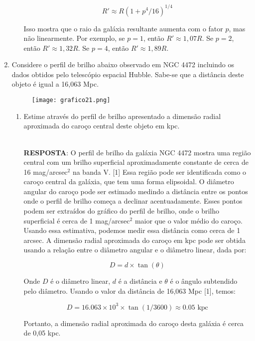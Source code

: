 \documentclass[a4paper,12pt]{article}
\begin{document}
\begin{enumerate}
\begin{enumerate}
$$
R' \approx R(1+p^4/16)^{1/4}
$$

Isso mostra que o raio da galáxia resultante aumenta com o fator $p$, mas não linearmente. Por exemplo, se $p=1$, então $R' \approx 1,07 R$. Se $p=2$, então $R' \approx 1,32 R$. Se $p=4$, então $R' \approx 1,89 R$.

\noindent\hrulefill

\end{enumerate}

\item Considere o perfil de brilho abaixo observado em NGC 4472 incluindo os dados obtidos pelo telescópio espacial Hubble. Sabe-se que a distância deste objeto é igual a 16,063 Mpc.

\begin{figure}[H]
\centering
\texttt{[image: grafico21.png]}
\end{figure}

\begin{enumerate}
\item Estime através do perfil de brilho apresentado a dimensão radial aproximada do caroço central deste objeto em kpc.

\noindent\hrulefill\\\textbf{RESPOSTA}: O perfil de brilho da galáxia NGC 4472 mostra uma região central com um brilho superficial aproximadamente constante de cerca de 16 mag/arcsec$^2$ na banda V. [1] Essa região pode ser identificada como o caroço central da galáxia, que tem uma forma elipsoidal. O diâmetro angular do caroço pode ser estimado medindo a distância entre os pontos onde o perfil de brilho começa a declinar acentuadamente. Esses pontos podem ser extraídos do gráfico do perfil de brilho, onde o brilho superficial é cerca de 1 mag/arcsec$^2$ maior que o valor médio do caroço. Usando essa estimativa, podemos medir essa distância como cerca de 1 arcsec. A dimensão radial aproximada do caroço em kpc pode ser obtida usando a relação entre o diâmetro angular e o diâmetro linear, dada por:

$$
D = d \times \tan(\theta)
$$

Onde $D$ é o diâmetro linear, $d$ é a distância e $\theta$ é o ângulo subtendido pelo diâmetro. Usando o valor da distância de 16,063 Mpc [1], temos:

$$
D = 16.063 \times 10^3 \times \tan(1/3600) \approx 0.05 \text{ kpc}
$$

Portanto, a dimensão radial aproximada do caroço desta galáxia é cerca de 0,05 kpc.


\end{enumerate}
\end{enumerate}
\end{document}
